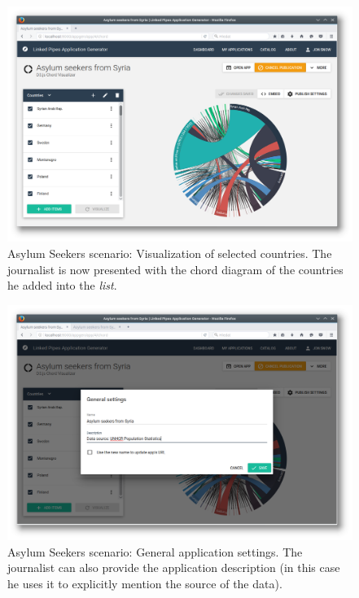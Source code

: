 \begin{figure}
	\centering
	\includegraphics[width=145mm]{img/05_scenario_06_ready_application}
	\caption{Asylum Seekers scenario: Visualization of selected countries. The journalist is now presented with the chord diagram of the countries he added into the \emph{list}.}
	\label{fig:scenario-06-ready application}
\end{figure}
\begin{figure}
	\centering
	\includegraphics[width=145mm]{img/05_scenario_07_general_settings}
	\caption{Asylum Seekers scenario: General application settings. The journalist can also provide the application description (in this case he uses it to explicitly mention the source of the data).}
	\label{fig:scenario-07-general-settings}
\end{figure}
